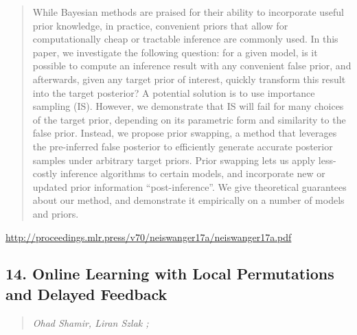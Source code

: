 \documentclass{article}
\begin{document}
\begin{quote}
    While Bayesian methods are praised for their ability to incorporate useful prior knowledge, in practice, convenient priors that allow for computationally cheap or tractable inference are commonly used. In this paper, we investigate the following question: for a given model, is it possible to compute an inference result with any convenient false prior, and afterwards, given any target prior of interest, quickly transform this result into the target posterior? A potential solution is to use importance sampling (IS). However, we demonstrate that IS will fail for many choices of the target prior, depending on its parametric form and similarity to the false prior. Instead, we propose prior swapping, a method that leverages the pre-inferred false posterior to efficiently generate accurate posterior samples under arbitrary target priors. Prior swapping lets us apply less-costly inference algorithms to certain models, and incorporate new or updated prior information “post-inference”. We give theoretical guarantees about our method, and demonstrate it empirically on a number of models and priors.  \end{quote}

\href{http://proceedings.mlr.press/v70/neiswanger17a/neiswanger17a.pdf}{http://proceedings.mlr.press/v70/neiswanger17a/neiswanger17a.pdf}

\subsection{14. Online Learning with Local Permutations and Delayed Feedback}

\begin{quote}
\footnotesize{\textit{Ohad Shamir, Liran Szlak ;}}
\end{quote}
\end{document}
